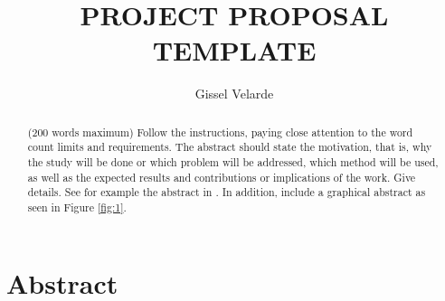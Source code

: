 \documentclass[11pt,a4paper]{article}
\title{PROJECT PROPOSAL TEMPLATE}
\author{ Gissel Velarde }
\begin{document}
\maketitle	

 \tableofcontents
 \pagebreak
\begin{abstract}
({\color{blue}200 words maximum}) Follow the instructions, paying close attention to the word count limits and requirements. The abstract should state the motivation, that is, why the study will be done or which problem will be addressed, which method will be used, as well as the expected results and contributions or implications of the work. Give details. See for example the abstract in \cite{krizhevsky2017imagenet}. In addition, include a graphical abstract as seen in Figure \ref{fig:1}.
\end{abstract}


\section*{Abstract}
\end{document}

